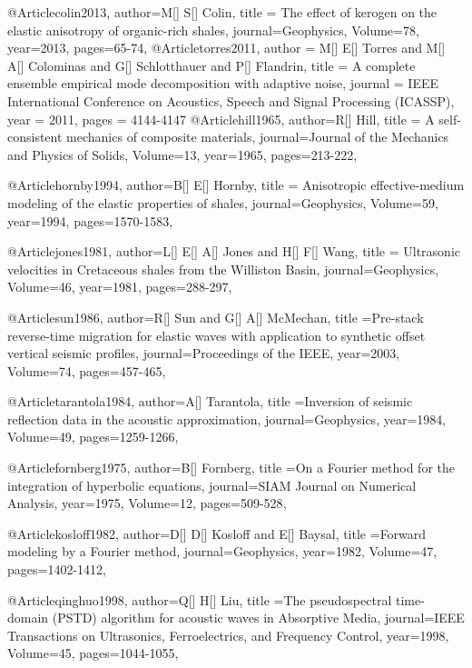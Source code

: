 @Article{colin2013,
  author={M[] S[] Colin},
  title = {The effect of kerogen on the elastic anisotropy of organic-rich shales},
  journal={Geophysics},
  Volume=78,
  year=2013,
  pages={65-74},
}
@Article{torres2011,
  author = 	 {M[] E[] Torres and M[] A[] Colominas and G[] Schlotthauer and P[] Flandrin},
  title = 	 {A complete ensemble empirical mode decomposition with adaptive noise},
  journal = 	 {IEEE International Conference on Acoustics, Speech and Signal Processing (ICASSP)},
  year = 	 2011,
  pages = 	 {4144-4147}
}
@Article{hill1965,
  author={R[] Hill},
  title = {A self-consistent mechanics of composite materials},
  journal={Journal of the Mechanics and Physics of Solids},
  Volume=13,
  year=1965,
  pages={213-222},
}

@Article{hornby1994,
  author={B[] E[] Hornby},
  title = {Anisotropic effective-medium modeling of the elastic properties of shales},
  journal={Geophysics},
  Volume=59,
  year=1994,
  pages={1570-1583},
}

@Article{jones1981,
  author={L[] E[] A[] Jones and H[] F[] Wang},
  title = {Ultrasonic velocities in Cretaceous shales from the Williston Basin},
  journal={Geophysics},
  Volume=46,
  year=1981,
  pages={288-297},
}


@Article{sun1986,
  author={R[] Sun and G[] A[] McMechan},
  title ={Pre-stack reverse-time migration for elastic waves with application to synthetic offset vertical seismic profiles},
  journal={Proceedings of the IEEE},
  year=2003,
  Volume=74,
  pages={457-465},
}

@Article{tarantola1984,
  author={A[] Tarantola},
  title ={Inversion of seismic reflection data in the acoustic approximation},
  journal={Geophysics},
  year=1984,
  Volume=49,
  pages={1259-1266},
}

@Article{fornberg1975,
  author={B[] Fornberg},
  title ={On a {F}ourier method for the integration of hyperbolic equations},
  journal={SIAM Journal on Numerical Analysis},
  year=1975,
  Volume=12,
  pages={509-528},
}

@Article{kosloff1982,
  author={D[] D[] Kosloff and E[] Baysal},
  title ={Forward modeling by a {F}ourier method},
  journal={Geophysics},
  year=1982,
  Volume=47,
  pages={1402-1412},
}

@Article{qinghuo1998,
  author={Q[] H[] Liu},
  title ={The pseudospectral time-domain (PSTD) algorithm for acoustic waves in Absorptive Media},
  journal={IEEE Transactions on Ultrasonics, Ferroelectrics, and Frequency Control},
  year=1998,
  Volume=45,
  pages={1044-1055},
}

